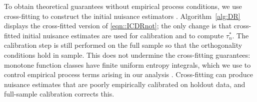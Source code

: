 \documentclass[11pt]{article}
\theoremstyle{plain}
\begin{document}
 

To obtain theoretical guarantees without empirical process conditions, we use cross-fitting to construct the initial
nuisance estimators \citep{van2011cross, DoubleML}. Algorithm~\ref{alg:DR} displays the cross-fitted version of \eqref{eqn::ICDRnot}; the only change is that cross-fitted initial nuisance estimates are used for calibration and to compute $\tau_n^*$. The calibration step is still performed on the full sample so that
the orthogonality conditions hold in sample. This does not undermine the
cross-fitting guarantees: monotone function classes have finite uniform entropy integrals, which we use to control empirical process terms arising in our analysis
\citep{rabenseifner2025calibrationstrategiesrobustcausal}. Cross-fitting can produce nuisance estimates that are poorly empirically calibrated on holdout data, and full-sample calibration corrects this.



 



 
 
 

 



 
 
\end{document}

